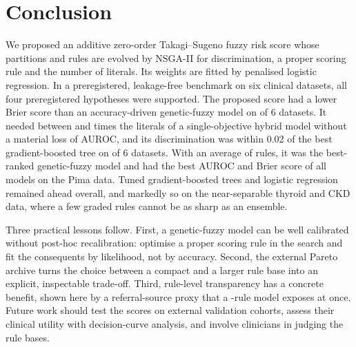 \section{Conclusion}
\label{sec:conclusion}

We proposed an additive zero-order Takagi--Sugeno fuzzy risk score whose partitions and
rules are evolved by NSGA-II for discrimination, a proper scoring rule and the number of
literals. Its weights are fitted by penalised logistic regression. In a preregistered,
leakage-free benchmark on six clinical datasets, all four preregistered hypotheses were
supported. The proposed score had a lower Brier score than an accuracy-driven
genetic-fuzzy model on \resHOneWins{} of 6 datasets. It needed between
\resHFourRatioMin{} and \resHFourRatioMax{} times the literals of a single-objective
hybrid model without a material loss of AUROC, and its discrimination
was within 0.02 of the best gradient-boosted tree on \resHTwoN{} of 6 datasets. With an
average of \resMeanRulesAllMOFuzzyNSGAII{} rules, it was the best-ranked genetic-fuzzy
model and had the best AUROC and Brier score of all models on the Pima data. Tuned gradient-boosted trees
and logistic regression remained ahead overall, and markedly so on the near-separable
thyroid and CKD data, where a few graded rules cannot be as sharp as an ensemble.

Three practical lessons follow. First, a genetic-fuzzy model can be well calibrated
without post-hoc recalibration: optimise a proper scoring rule in the search and fit the
consequents by likelihood, not by accuracy. Second, the external Pareto archive turns
the choice between a compact and a larger rule base into an explicit, inspectable
trade-off. Third, rule-level transparency has a concrete benefit, shown here by a
referral-source proxy that a \resRulesNThyroid{}-rule model exposes at once. Future work should
test the scores on external validation cohorts, assess their clinical utility with
decision-curve analysis, and involve clinicians in judging the rule bases.
